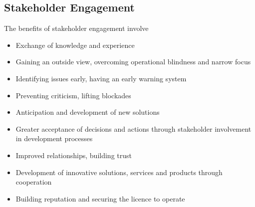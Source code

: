 \documentclass[11pt]{article}
\theoremstyle{definition}
\begin{document}
\subsection{Stakeholder Engagement}
The benefits of stakeholder engagement involve
\begin{itemize}
	\item Exchange of knowledge and experience
	\item Gaining an outside view, overcoming operational blindness and narrow focus
	\item Identifying issues early, having an early warning system
	\item Preventing criticism, lifting blockades
	\item Anticipation and development of new solutions
	\item Greater acceptance of decisions and actions through stakeholder involvement in development processes
	\item Improved relationships, building trust
	\item Development of innovative solutions, services and products through cooperation
	\item Building reputation and securing the licence to operate
\end{itemize}
\end{document}
